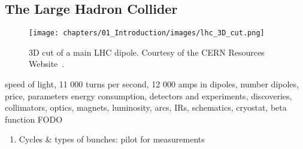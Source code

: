 \subsection{The Large Hadron Collider}

\begin{figure}[H]
    \texttt{[image: chapters/01\_Introduction/images/lhc\_3D\_cut.png]}
    \caption{3D cut of a main LHC dipole. Courtesy of the CERN Resources Website~\cite{cern-resources}.}
    \label{fig:3d_cut_dipole}
\end{figure}

speed of light, 11 000 turns per second, 12 000 amps in dipoles, number dipoles, price, parameters
energy consumption, detectors and experiments, discoveries, collimators, optics, magnets, luminosity, arcs, IRs, schematics, cryostat, beta function FODO

\begin{enumerate}
    \color{red}
    \item Cycles \& types of bunches: pilot for measurements
\end{enumerate}